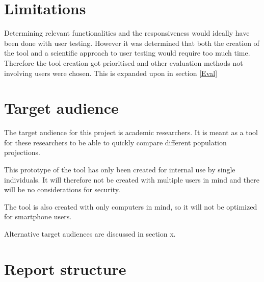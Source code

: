 \section{Limitations}\label{Lim}

Determining relevant functionalities and the responsiveness would ideally have been done with user testing.  However it was determined that both the creation of the tool and a scientific approach to user testing would require too much time.
Therefore the tool creation got prioritised and other evaluation methods not involving users were chosen. This is expanded upon in section \ref{Eval}

\section{Target audience}\label{TA}

The target audience for this project is academic researchers. It is meant as a tool for these researchers to be able to quickly compare different population projections. 

This prototype of the tool has only been created for internal use by single individuals. It will therefore not be created with multiple users in mind and there will be no considerations for security.


The tool is also created with only computers in mind, so it will not be optimized for smartphone users. 

Alternative target audiences are discussed in section x.

\section{Report structure}

%
%

